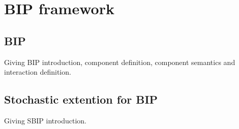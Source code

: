 \section{BIP framework}
\label{sec:rsd}

\subsection{BIP}
Giving BIP introduction, component definition, component semantics and interaction definition.

\subsection{Stochastic extention for BIP}
Giving SBIP introduction.